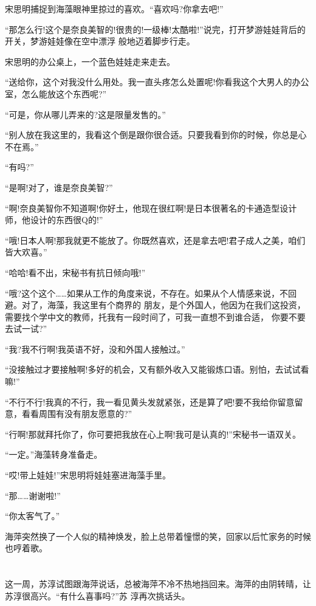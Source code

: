 \documentclass[11pt,a4paper,onecolumn]{article}
\begin{document}
宋思明捕捉到海藻眼神里掠过的喜欢。``喜欢吗?你拿去吧!''

``那怎么行!这个是奈良美智的!很贵的!一级棒!太酷啦!''说完，打开梦游娃娃背后的开关，梦游娃娃像在空中漂浮
般地迈着脚步行走。

宋思明的办公桌上，一个蓝色娃娃走来走去。

``送给你，这个对我没什么用处。我一直头疼怎么处置呢!你看我这个大男人的办公室，怎么能放这个东西呢?''

``可是，你从哪儿弄来的?这是限量发售的。''

``别人放在我这里的，我看这个倒是跟你很合适。只要我看到你的时候，你总是心不在焉。''

``有吗?''

``是啊!对了，谁是奈良美智?''

``啊!奈良美智你不知道啊!你好土，他现在很红啊!是日本很著名的卡通造型设计师，他设计的东西很Q的!''

``哦!日本人啊!那我就更不能放了。你既然喜欢，还是拿去吧!君子成人之美，咱们皆大欢喜。''

``哈哈!看不出，宋秘书有抗日倾向哦!''

``哦?这个这个……如果从工作的角度来说，不存在。如果从个人情感来说，不回避。对了，海藻，我这里有个商界的
朋友，是个外国人，他因为在我们这投资，需要找个学中文的教师，托我有一段时间了，可我一直想不到谁合适，
你要不要去试一试?''

``我?我不行啊!我英语不好，没和外国人接触过。''

``没接触过才要接触啊!多好的机会，又有额外收入又能锻炼口语。别怕，去试试看嘛!''

``不行不行!我真的不行，我一看见黄头发就紧张，还是算了吧!要不我给你留意留意，看看周围有没有朋友愿意的?''

``行啊!那就拜托你了，你可要把我放在心上啊!我可是认真的!''宋秘书一语双关。

``一定。''海藻转身准备走。

``哎!带上娃娃!''宋思明将娃娃塞进海藻手里。

``那……谢谢啦!''

``你太客气了。''

海萍突然换了一个人似的精神焕发，脸上总带着憧憬的笑，回家以后忙家务的时候也哼着歌。

\section[\thesection]{}

这一周，苏淳试图跟海萍说话，总被海萍不冷不热地挡回来。海萍的由阴转晴，让苏淳很高兴。``有什么喜事吗?''苏
淳再次挑话头。
\end{document}
